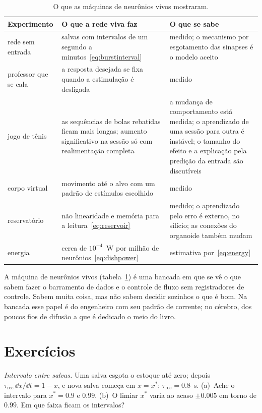 \begin{table}[t]
\centering
\footnotesize
\setlength{\tabcolsep}{4pt}
\renewcommand{\arraystretch}{1.15}
\begin{tabular}{>{\raggedright}p{2.8cm}>{\raggedright}p{4.2cm}>{\raggedright\arraybackslash}p{5.8cm}}
\toprule
Experimento & O que a rede viva faz & O que se sabe \\
\midrule
rede sem entrada & salvas com intervalos de um segundo a minutos~\eqref{eq:burstinterval} & medido; o mecanismo por esgotamento das sinapses é o modelo aceito \\
professor que se cala & a resposta desejada se fixa quando a estimulação é desligada & medido \\
jogo de tênis & as sequências de bolas rebatidas ficam mais longas; aumento significativo na sessão só com realimentação completa & a mudança de comportamento está medida; o aprendizado de uma sessão para outra é instável; o tamanho do efeito e a explicação pela predição da entrada são discutíveis \\
corpo virtual & movimento até o alvo com um padrão de estímulos escolhido & medido \\
reservatório & não linearidade e memória para a leitura~\eqref{eq:reservoir} & medido; o aprendizado pelo erro é externo, no silício; as conexões do organoide também mudam \\
energia & cerca de $10^{-4}$~W por milhão de neurônios~\eqref{eq:dishpower} & estimativa por~\eqref{eq:energy} \\
\bottomrule
\end{tabular}
\caption{O que as máquinas de neurônios vivos mostraram.}
\label{tab:livingmachine}
\end{table}

A máquina de neurônios vivos (tabela~\ref{tab:livingmachine}) é uma bancada em que se vê o que sabem fazer o barramento de dados e o controle de fluxo sem registradores de controle. Sabem muita coisa, mas não sabem decidir sozinhos o que é bom. Na bancada esse papel é do engenheiro com seu padrão de corrente; no cérebro, dos poucos fios de difusão a que é dedicado o meio do livro.

\section{Exercícios}

\begin{exercise}[\lvlA]
\label{ex:21:1}
\emph{Intervalo entre salvas.} Uma salva esgota o estoque até zero; depois $\tau_{\text{rec}}\,\dd x/\dd t=1-x$, e nova salva começa em $x=x^*$; $\tau_{\text{rec}}=0.8$~s. (a)~Ache o intervalo para $x^*=0.9$ e $0.99$. (b)~O limiar $x^*$ varia ao acaso $\pm0.005$ em torno de $0.99$. Em que faixa ficam os intervalos?
\end{exercise}

